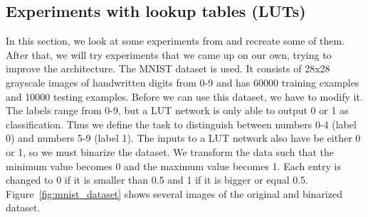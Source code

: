 \subsection{Experiments with lookup tables (LUTs)}
In this section, we look at some experiments from \cite{chatterjee2018learning} and recreate some of them. After that, we will try experiments that we came up on our own, trying to improve the architecture. The MNIST dataset \cite{mnist} is used. It consists of 28x28 grayscale images of handwritten digits from 0-9 and has 60000 training examples and 10000 testing examples. Before we can use this dataset, we have to modify it. The labels range from 0-9, but a LUT network is only able to output 0 or 1 as classification. Thus we define the task to distinguish between numbers 0-4 (label 0) and numbers 5-9 (label 1). The inputs to a LUT network also have be either 0 or 1, so we must binarize the dataset. We transform the data such that the minimum value becomes 0 and the maximum value becomes 1. Each entry is changed to 0 if it is smaller than 0.5 and 1 if it is bigger or equal 0.5. Figure~\ref{fig:mnist_dataset} shows several images of the original and binarized dataset.

